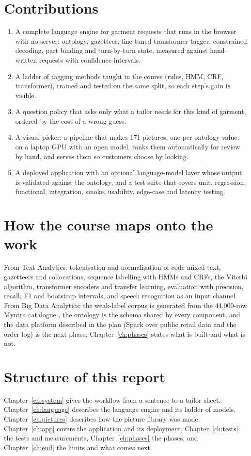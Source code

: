 \section{Contributions}
\begin{enumerate}
\item A complete language engine for garment requests that runs in the browser with no server: ontology, gazetteer, fine-tuned transformer tagger, constrained decoding, part binding and turn-by-turn state, measured against hand-written requests with confidence intervals.
\item A ladder of tagging methods taught in the course (rules, HMM, CRF, transformer), trained and tested on the same split, so each step's gain is visible.
\item A question policy that asks only what a tailor needs for this kind of garment, ordered by the cost of a wrong guess.
\item A visual picker: a pipeline that makes 171 pictures, one per ontology value, on a laptop GPU with an open model, ranks them automatically for review by hand, and serves them so customers choose by looking.
\item A deployed application with an optional language-model layer whose output is validated against the ontology, and a test suite that covers unit, regression, functional, integration, smoke, usability, edge-case and latency testing.
\end{enumerate}

\section{How the course maps onto the work}
From Text Analytics: tokenisation and normalisation of code-mixed text, gazetteers and collocations, sequence labelling with HMMs and CRFs, the Viterbi algorithm, transformer encoders and transfer learning, evaluation with precision, recall, F1 and bootstrap intervals, and speech recognition as an input channel. From Big Data Analytics: the weak-label corpus is generated from the 44,000-row Myntra catalogue \cite{aggarwal2019myntra}, the ontology is the schema shared by every component, and the data platform described in the plan (Spark over public retail data and the order log) is the next phase; Chapter~\ref{ch:phases} states what is built and what is not.

\section{Structure of this report}
Chapter~\ref{ch:system} gives the workflow from a sentence to a tailor sheet. Chapter~\ref{ch:language} describes the language engine and its ladder of models. Chapter~\ref{ch:pictures} describes how the picture library was made. Chapter~\ref{ch:app} covers the application and its deployment, Chapter~\ref{ch:tests} the tests and measurements, Chapter~\ref{ch:phases} the phases, and Chapter~\ref{ch:end} the limits and what comes next.
